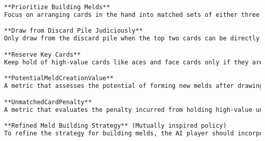 \begin{tcolorbox}[
breakable,
title=Gameplay AI policy component as texts,  
colframe=gray, 
colback=white,
]
\begin{lstlisting}[language=markdown]
**Prioritize Building Melds**
Focus on arranging cards in the hand into matched sets of either three or four of a kind, or sequences of three or more cards of the same suit. Discard cards that do not contribute towards completing a meld.

**Draw from Discard Pile Judiciously**
Only draw from the discard pile when the top two cards can be directly used to form a meld or significantly improve the hand. Otherwise, prefer drawing from the stock pile to maintain unpredictability.

**Reserve Key Cards**
Keep hold of high-value cards like aces and face cards only if they are part of an ongoing strategy to complete a meld or if they are necessary to win the game soon. Otherwise, discard them to minimize penalty points.

**PotentialMeldCreationValue**
A metric that assesses the potential of forming new melds after drawing two cards, either from the stock pile or discard pile. It evaluates the likely improvement in the hand's structure, considering both the draw options and the current meld opportunities.

**UnmatchedCardPenalty**
A metric that evaluates the penalty incurred from holding high-value unmatched cards. This metric helps in deciding the priority of discarding high-value cards from the hand to lower potential score penalties.

**Refined Meld Building Strategy** (Mutually inspired policy)
To refine the strategy for building melds, the AI player should incorporate the following steps: prioritize drawing from the source that maximizes 'PotentialMeldCreationValue.' When choosing cards to discard, evaluate based on 'UnmatchedCardPenalty,' preferably discarding high-penalty cards unless they significantly contribute to potential melds. Use 'MeldCompletionLikelihood' to assess laying off opportunities. Lastly, factor in 'OpponentInterferenceRisk' to prevent assisting opponents with your discards. These criteria ensure strategic decision-making based on the game state, maximizing winning potential and minimizing penalties.
\end{lstlisting}
\end{tcolorbox}

